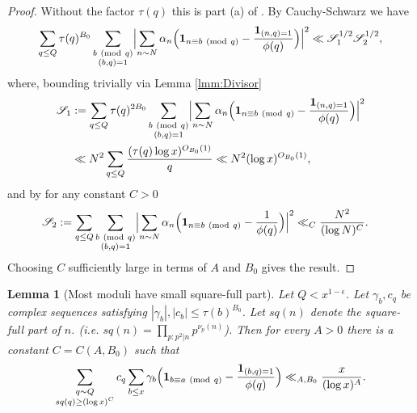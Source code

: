 \documentclass[10pt]{amsart}
\theoremstyle{plain}
\newtheorem{lmm}[thrm]{Lemma}
\numberwithin{equation}{section}
\newcommand{\Mod}[1]{\ (\mathrm{mod}\ #1)}
\begin{document}
%
%
%
%
\begin{proof}
Without the factor $\tau(q)$ this is part (a) of \cite[Theorem 0]{BFI1}. By Cauchy-Schwarz we have
\[
\sum_{q\le Q}\tau(q)^{B_0}\sum_{\substack{b\Mod{q}\\ (b,q)=1}}\Bigl|\sum_{n\sim N}\alpha_n \Bigl(\mathbf{1}_{n\equiv b\Mod{q}}-\frac{\mathbf{1}_{(n,q)=1}}{\phi(q)}\Bigr)\Bigr|^2\ll \mathscr{S}_1^{1/2}\mathscr{S}_2^{1/2},
\]
where, bounding trivially via Lemma \ref{lmm:Divisor}
\begin{align*}
\mathscr{S}_1&:=\sum_{q\le Q}\tau(q)^{2B_0}\sum_{\substack{b\Mod{q}\\ (b,q)=1}}\Bigl|\sum_{n\sim N}\alpha_n \Bigl(\mathbf{1}_{n\equiv b\Mod{q}}-\frac{\mathbf{1}_{(n,q)=1}}{\phi(q)}\Bigr)\Bigr|^2\\
&\ll N^2\sum_{q\le Q}\frac{(\tau(q)\log{x})^{O_{B_0}(1)}}{q}\ll N^2(\log{x})^{O_{B_0}(1)},
\end{align*}
and by \cite[Theorem 0]{BFI1} for any constant $C>0$
\begin{align*}
\mathscr{S}_2&:=\sum_{q\le Q}\sum_{\substack{b\Mod{q}\\ (b,q)=1}}\Bigl|\sum_{n\sim N}\alpha_n \Bigl(\mathbf{1}_{n\equiv b\Mod{q}}-\frac{1}{\phi(q)}\Bigr)\Bigr|^2\ll_C \frac{N^2}{(\log{N})^{C}}.
\end{align*}
 Choosing $C$ sufficiently large in terms of $A$ and $B_0$ gives the result.
\end{proof}
%
%
%
%
%
%
%
%
\begin{lmm}[Most moduli have small square-full part]\label{lmm:Squarefree}
Let $Q<x^{1-\epsilon}$. Let $\gamma_b,c_q$ be complex sequences satisfying $|\gamma_b|, |c_b|\le \tau(b)^{B_0}$. Let $sq(n)$ denote the square-full part of $n$. (i.e. $sq(n)=\prod_{p:p^2|n}p^{\nu_p(n)}$). Then for every $A>0$ there is a constant $C=C(A,B_0)$ such that
\[
\sum_{\substack{q\sim Q\\ sq(q)\ge (\log{x})^C}}c_q\sum_{b\le  x}\gamma_b\Bigl(\mathbf{1}_{b\equiv a\Mod{q}}-\frac{\mathbf{1}_{(b,q)=1}}{\phi(q)}\Bigr)\ll_{A,B_0} \frac{x}{(\log{x})^A}.
\]
\end{lmm}
%
%
%
%
\end{document}
